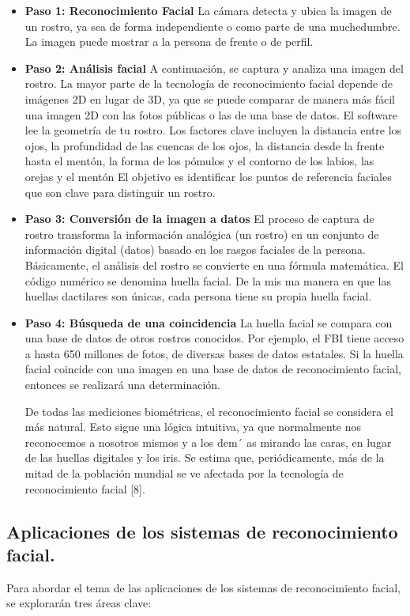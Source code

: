 \begin{itemize}
  \item \textbf{Paso 1: Reconocimiento Facial} 
La cámara detecta y ubica la imagen de un rostro, ya sea de forma independiente o como parte de una muchedumbre. La imagen puede mostrar a la
persona de frente o de perfil.
  \item \textbf{Paso 2: Análisis facial}
A continuación, se captura y analiza una imagen del rostro. La mayor parte
de la tecnología de reconocimiento facial depende de imágenes 2D en lugar de
3D, ya que se puede comparar de manera más fácil una imagen 2D con las
fotos públicas o las de una base de datos. El software lee la geometría de tu
rostro. Los factores clave incluyen la distancia entre los ojos, la profundidad de
las cuencas de los ojos, la distancia desde la frente hasta el mentón, la forma
de los pómulos y el contorno de los labios, las orejas y el mentón El objetivo
es identificar los puntos de referencia faciales que son clave para distinguir un
rostro.
  \item \textbf{Paso 3: Conversión de la imagen a datos}
El proceso de captura de rostro transforma la información analógica (un
rostro) en un conjunto de información digital (datos) basado en los rasgos faciales de la persona. Básicamente, el análisis del rostro se convierte en una
fórmula matemática. El código numérico se denomina huella facial. De la mis
ma manera en que las huellas dactilares son únicas, cada persona tiene su
propia huella facial.
  \item \textbf{Paso 4: Búsqueda de una coincidencia}
La huella facial se compara con una base de datos de otros rostros conocidos. Por ejemplo, el FBI tiene acceso a hasta 650 millones de fotos, de diversas
bases de datos estatales. Si la huella facial coincide con una imagen en una base
de datos de reconocimiento facial, entonces se realizará una determinación.

De todas las mediciones biométricas, el reconocimiento facial se considera
el más natural. Esto sigue una lógica intuitiva, ya que normalmente nos reconocemos a nosotros mismos y a los dem´ as mirando las caras, en lugar de
las huellas digitales y los iris. Se estima que, periódicamente, más de la mitad
de la población mundial se ve afectada por la tecnología de reconocimiento
facial [8].
\end{itemize}


\subsection{Aplicaciones de los sistemas de reconocimiento facial.}
Para abordar el tema de las aplicaciones de los sistemas de reconocimiento
facial, se explorarán tres áreas clave:


